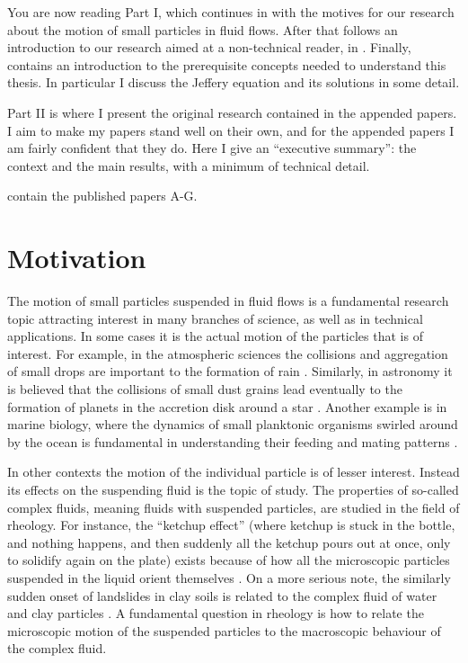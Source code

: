 \documentclass[thesis.tex]{subfiles}
\begin{document}
You are now reading Part I, which continues in  with the motives for our research about the motion of small particles in fluid flows. After that follows an introduction to our research aimed at a non-technical reader, in . Finally,  contains an introduction to the prerequisite concepts needed to understand this thesis. In particular I discuss the Jeffery equation and its solutions in some detail.

Part II is where I present the original research contained in the appended papers. I aim to make my papers stand well on their own, and for the appended papers I am fairly confident that they do. Here I give an ``executive summary'': the context and the main results, with a minimum of technical detail.


 contain the published papers A-G.

\chapter{Motivation}\label{sec:motivation}

The motion of small particles suspended in fluid flows is a fundamental research topic attracting interest in many branches of science, as well as in technical applications. In some cases it is the actual motion of the particles that is of interest. For example, in the atmospheric sciences the collisions and aggregation of small drops are important to the formation of rain \cite{devenish2012}. Similarly, in astronomy it is believed that the collisions of small dust grains lead eventually to the formation of planets in the accretion disk around a star \cite{wilkinson2008}. Another example is in marine biology, where the dynamics of small planktonic organisms swirled around by the ocean is fundamental in understanding their feeding and mating patterns \cite{guasto2012}. 

In other contexts the motion of the individual particle is of lesser interest. Instead its effects on the suspending fluid is the topic of study. The properties of so-called complex fluids, meaning fluids with suspended particles, are studied in the field of rheology. For instance, the ``ketchup effect'' (where ketchup is stuck in the bottle, and nothing happens, and then suddenly all the ketchup pours out at once, only to solidify again on the plate) exists because of how all the microscopic particles suspended in the liquid orient themselves \cite{bayod2008}. On a more serious note, the similarly sudden onset of landslides in clay soils is related to the complex fluid of water and clay particles \cite{coussot2002}. A fundamental question in rheology is how to relate the microscopic motion of the suspended particles to the macroscopic behaviour of the complex fluid.
\end{document}
